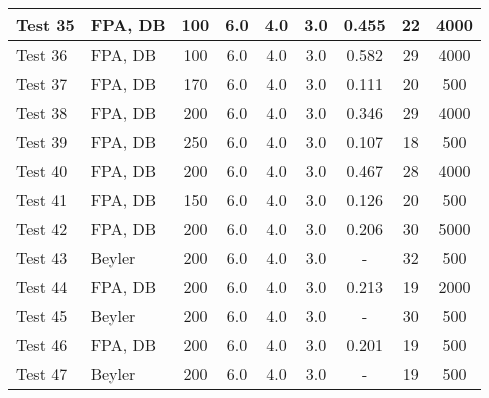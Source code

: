 \begin{table}[!ht]
\begin{center}
\begin{tabular}{|l|l|c|c|c|c|c|c|c|}
Test 35    &  FPA, DB           &  100            &  6.0       &  4.0       &  3.0       &  0.455          &  22                    &  4000              \\ \hline
Test 36    &  FPA, DB           &  100            &  6.0       &  4.0       &  3.0       &  0.582          &  29                    &  4000              \\ \hline
Test 37    &  FPA, DB           &  170            &  6.0       &  4.0       &  3.0       &  0.111          &  20                    &  500               \\ \hline
Test 38    &  FPA, DB           &  200            &  6.0       &  4.0       &  3.0       &  0.346          &  29                    &  4000              \\ \hline
Test 39    &  FPA, DB           &  250            &  6.0       &  4.0       &  3.0       &  0.107          &  18                    &  500               \\ \hline
Test 40    &  FPA, DB           &  200            &  6.0       &  4.0       &  3.0       &  0.467          &  28                    &  4000              \\ \hline
Test 41    &  FPA, DB           &  150            &  6.0       &  4.0       &  3.0       &  0.126          &  20                    &  500               \\ \hline
Test 42    &  FPA, DB           &  200            &  6.0       &  4.0       &  3.0       &  0.206          &  30                    &  5000              \\ \hline
Test 43    &  Beyler            &  200            &  6.0       &  4.0       &  3.0       &  -              &  32                    &  500               \\ \hline
Test 44    &  FPA, DB           &  200            &  6.0       &  4.0       &  3.0       &  0.213          &  19                    &  2000              \\ \hline
Test 45    &  Beyler            &  200            &  6.0       &  4.0       &  3.0       &  -              &  30                    &  500               \\ \hline
Test 46    &  FPA, DB           &  200            &  6.0       &  4.0       &  3.0       &  0.201          &  19                    &  500               \\ \hline
Test 47    &  Beyler            &  200            &  6.0       &  4.0       &  3.0       &  -              &  19                    &  500               \\ \hline

\end{tabular}
\end{center}
\end{table}
